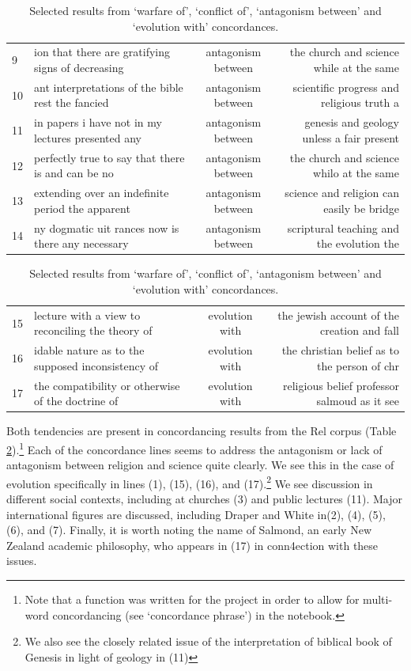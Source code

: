 \documentclass{article}
\begin{document}
\begin{table}[]
\begin{tabular}{l|lcr}
        9 & ion that there are gratifying signs of decreasing & antagonism between & the church and science while at the same \\
        10 & ant interpretations of the bible rest the fancied & antagonism between & scientific progress and religious truth a \\
        11 & in papers i have not in my lectures presented any & antagonism between &  genesis and geology unless a fair present \\
        12  & perfectly true to say that there is and can be no &  antagonism between &  the church and science whilo at the same  \\
        13  & extending over an indefinite period the apparent &  antagonism between &  science and religion can easily be bridge \\
        14  &  ny dogmatic uit rances now is there any necessary  & antagonism between &  scriptural teaching and the evolution the \\
      \end{tabular}
      \begin{tabular}{l|lcr}
        15  & lecture with a view to reconciling the theory of &  evolution with &  the jewish account of the creation and fall  \\
        16  & idable nature as to the supposed inconsistency of  & evolution with  & the christian belief as to the person of chr \\
        17  & the compatibility or otherwise of the doctrine of  & evolution with &  religious belief professor salmoud as it see \\
        \end{tabular}
        \caption{Selected results from `warfare of', `conflict of', `antagonism between' and `evolution with' concordances.}
        \label{t:rel-concordance}
\end{table}

Both tendencies are present in concordancing results from the Rel corpus (Table \ref{t:rel-concordance}).\footnote{Note that a function was written for the project in order to allow for multi-word concordancing (see `concordance phrase') in the notebook.} Each of the concordance lines seems to address the antagonism or lack of antagonism between religion and science quite clearly. We see this in the case of evolution specifically in lines (1), (15), (16), and (17).\footnote{We also see the closely related issue of the interpretation of biblical book of Genesis in light of geology in (11)} We see discussion in different social contexts, including at churches (3) and public lectures (11). Major international figures are discussed, including Draper and White in(2), (4), (5), (6), and (7). Finally, it is worth noting the name of Salmond, an early New Zealand academic philosophy, who appears in (17) in conn4ection with these issues.
\end{document}
